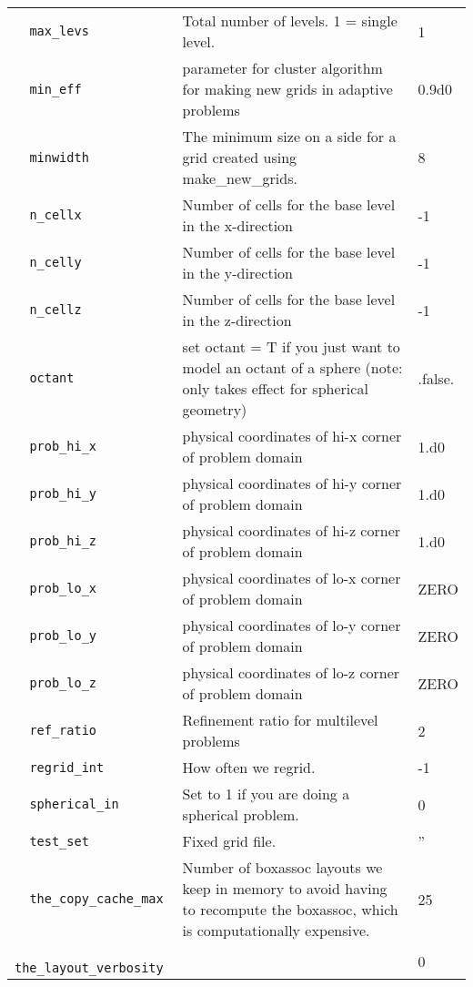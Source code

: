 \begin{landscape}
{\begin{center}
\begin{longtable}{|l|p{5.25in}|l|}
\verb=  max_levs  = &   Total number of levels.  1 = single level.  &  1 \\
\rowcolor{tableShade}
\verb=  min_eff  = &   parameter for cluster algorithm for making new grids in adaptive problems  &  0.9d0 \\
\verb=  minwidth  = &   The minimum size on a side for a grid created using make\_new\_grids.  &  8 \\
\rowcolor{tableShade}
\verb=  n_cellx  = &   Number of cells for the base level in the x-direction  &  -1 \\
\verb=  n_celly  = &   Number of cells for the base level in the y-direction  &  -1 \\
\rowcolor{tableShade}
\verb=  n_cellz  = &   Number of cells for the base level in the z-direction  &  -1 \\
\verb=  octant  = &   set octant = T if you just want to model an octant of a sphere (note: only takes effect for spherical geometry)  &  .false. \\
\rowcolor{tableShade}
\verb=  prob_hi_x  = &   physical coordinates of hi-x corner of problem domain  &  1.d0 \\
\verb=  prob_hi_y  = &   physical coordinates of hi-y corner of problem domain  &  1.d0 \\
\rowcolor{tableShade}
\verb=  prob_hi_z  = &   physical coordinates of hi-z corner of problem domain  &  1.d0 \\
\verb=  prob_lo_x  = &   physical coordinates of lo-x corner of problem domain  &  ZERO \\
\rowcolor{tableShade}
\verb=  prob_lo_y  = &   physical coordinates of lo-y corner of problem domain  &  ZERO \\
\verb=  prob_lo_z  = &   physical coordinates of lo-z corner of problem domain  &  ZERO \\
\rowcolor{tableShade}
\verb=  ref_ratio  = &   Refinement ratio for multilevel problems  &  2 \\
\verb=  regrid_int  = &   How often we regrid.  &  -1 \\
\rowcolor{tableShade}
\verb=  spherical_in  = &   Set to 1 if you are doing a spherical problem.  &  0 \\
\verb=  test_set  = &   Fixed grid file.  &  '' \\
\rowcolor{tableShade}
\verb=  the_copy_cache_max  = &    Number of boxassoc layouts we keep in memory to avoid having to recompute the boxassoc, which is computationally expensive.  &  25 \\
\verb=  the_layout_verbosity  = &    &  0 \\

\end{longtable}
\end{center}}
\end{landscape}
